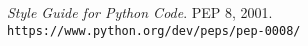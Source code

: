 \documentclass[a4paper,11pt]{article}
\begin{document}
\begin{thebibliography}{9}

\emph{Style Guide for Python Code}.
PEP 8, 2001.\\
\verb"https://www.python.org/dev/peps/pep-0008/"

\end{thebibliography}

\label{lastpage}
\end{document}
